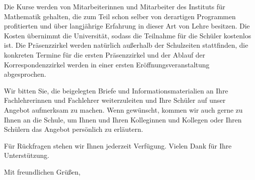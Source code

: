 \documentclass[a4paper,ngerman,12pt]{scrartcl}
\begin{document}
Die Kurse werden von Mitarbeiterinnen und Mitarbeiter des Instituts für
Mathematik gehalten, die zum Teil schon selber von derartigen Programmen
profitierten und über langjährige Erfahrung in dieser Art von Lehre besitzen.
Die Kosten übernimmt die Universität, sodass die Teilnahme für die Schüler
kostenlos ist. Die Präsenzzirkel werden natürlich außerhalb der Schulzeiten
stattfinden, die konkreten Termine für die ersten Präsenzzirkel und der Ablauf
der Korrespondenzzirkel werden in einer ersten Eröffnungsveranstaltung
abgesprochen.

Wir bitten Sie, die beigelegten Briefe und Informationsmaterialien an Ihre
Fachlehrerinnen und Fachlehrer weiterzuleiten und Ihre Schüler auf unser
Angebot aufmerksam zu machen. Wenn gewünscht, kommen wir auch gerne zu Ihnen an
die Schule, um Ihnen und Ihren Kolleginnen und Kollegen oder Ihren Schülern das
Angebot persönlich zu erläutern. 

Für Rückfragen stehen wir Ihnen jederzeit Verfügung. Vielen Dank für Ihre
Unterstützung. 

Mit freundlichen Grüßen,
\end{document}
